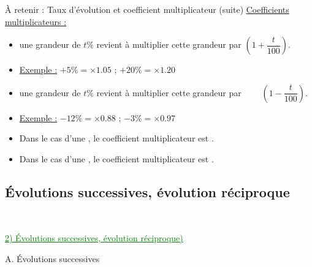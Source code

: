\documentclass[xcolor={dvipsnames}]{beamer}
\begin{document}
\begin{frame}

\begin{alertblock}{\`A retenir : Taux d'évolution et coefficient multiplicateur (suite)}
\underline{Coefficients multiplicateurs :} 
\begin{itemize}
	
	\item {} une grandeur de $t \%$ revient à multiplier cette grandeur par $\left(1 + \dfrac{t}{100}\right)$.
	
	\item \underline{Exemple :} $+ 5 \% = \times \num{1.05}$ ; $+ 20 \% = \times \num{1.20}$ \\
	
	\item {} une grandeur de $t \%$ revient à multiplier cette grandeur par $\qquad \left(1 - \dfrac{t}{100}\right)$.
	\item \underline{Exemple :} $- 12 \% = \times \num{0.88}$ ; $- 3 \% = \times \num{0.97}$ \\
	
	\item Dans le cas d'une , le coefficient multiplicateur est .
	
	\item Dans le cas d'une , le coefficient multiplicateur est .
\end{itemize}



\end{alertblock}

\end{frame}

\subsection{\'Evolutions successives, évolution réciproque}


\begin{frame}
\

\textcolor{Green}{\underline{2) \'Evolutions successives, évolution réciproque)}}\\

\vspace*{1cm}

A. \'Evolutions successives
\end{frame}
\end{document}
